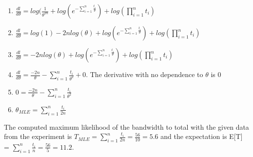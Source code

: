 \begin{enumerate}
    \item $ \frac{dl}{d\theta} = log(\frac{1}{\theta^{2n}} + log(e^{-\sum_{i=1}^{n} \frac{t_i}{\theta}}) + log(\prod_{i=1}^{n} t_i)$
    \item $ \frac{dl}{d\theta} = log(1) - 2n log(\theta) + log(e^{-\sum_{i=1}^{n} \frac{t_i}{\theta}}) + log(\prod_{i=1}^{n} t_i)$
    \item $ \frac{dl}{d\theta} =- 2n log(\theta) + log(e^{-\sum_{i=1}^{n} \frac{t_i}{\theta}}) + log(\prod_{i=1}^{n} t_i)$
    \item $ \frac{dl}{d\theta} =\frac{-2n}{\theta} - {\sum_{i=1}^{n} \frac{t_i}{\theta^2}}+0$. The derivative with no dependence to $\theta$ is 0
    \item $ 0 =\frac{-2n}{\theta} - {\sum_{i=1}^{n} \frac{t_i}{\theta^2}}$
    \item $ \theta_{MLE} ={\sum_{i=1}^{n} \frac{t_i}{2n}}$
\end{enumerate}
The computed maximum likelihood of the bandwidth to total with the given data from the experiment is $T_{MLE}={\sum_{i=1}^{n} \frac{t_i}{2n}} = \frac{56}{10} =5.6$ and the expectation is E[T] = $\sum_{i=1}^{n} \frac{t_i}{n} = \frac{56}{5} = 11.2$.